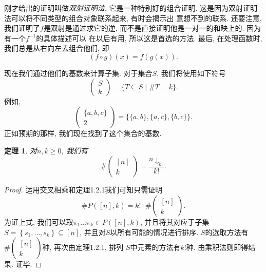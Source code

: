 \documentclass{ctexbook}
\newtheorem{thm}{定理}[section]
\begin{document}
刚才给出的证明叫做\textsl{双射证明法}, 它是一种特别好的组合证明. 这是因为双射证明法可以将不同类型的组合对象联系起来, 有时会揭示出
意想不到的联系. 还要注意, 我们证明了$f$是双射是通过求它的逆, 而不是直接证明他是一对一的和映上的. 因为有一个$f^{-1}$的具体描述可以
在以后有用, 所以这是首选的方法. 最后, 在处理函数时, 我们总是从右向左去组合他们, 即
$$(f \circ g)(x)=f(g(x)).$$

现在我们通过他们的基数来计算子集. 对于集合$S$, 我们将使用如下符号
$$
\left(\begin{array}{l}
S \\ k
\end{array}\right)=\{T \subseteq S \mid \# T=k\}.
$$
例如,
$$
\left(\begin{array}{c}
\{a, b, c\} \\ 2
\end{array}\right)=\{\{a, b\},\{a, c\},\{b, c\}\}.
$$
正如预期的那样, 我们现在找到了这个集合的基数.
    \begin{thm}
    	\textsl{对}$n, k \geqslant 0$, 我们有
    		$$
    		\#\left(\begin{array}{c}
    		{[n]} \\ k
    		\end{array}\right)=\frac{n \downarrow_{k}}{k !}.
    		$$
    \end{thm}
    \begin{proof}
    	运用交叉相乘和定理1.2.1我们可知只需证明
    	$$
    	\# P([n], k)=k ! \cdot \#\left(\begin{array}{c}
    	{[n]} \\ k
    	\end{array}\right).
    	$$
    	为证上式, 我们可以取$\pi_{1} \ldots \pi_{k} \in P([n], k)$, 并且将其对应于子集$S=\left\{s_{1}, \ldots, s_{k}\right\} \subseteq[n]$,
    	并且对$S$以所有可能的情况进行排序. $S$的选取方法有$\#\left(\begin{array}{c}{[n]} \\ k\end{array}\right)$种, 再次由定理1.2.1, 排列
    	$S$中元素的方法有$k !$种. 由乘积法则即得结果. 证毕.
    \end{proof}
\end{document}
